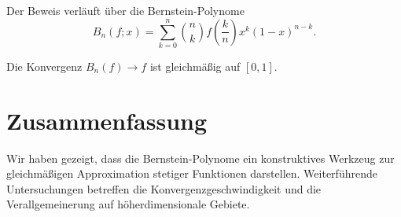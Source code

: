 \documentclass{article}
\begin{document}
Der Beweis verl\"auft \"uber die Bernstein-Polynome
\[
  B_n(f; x) = \sum_{k=0}^{n} \binom{n}{k} f\!\left(\frac{k}{n}\right)
  x^k (1-x)^{n-k}.
\]

Die Konvergenz $B_n(f) \to f$ ist gleichm\"a\ss{}ig auf $[0,1]$.

\section{Zusammenfassung}

Wir haben gezeigt, dass die Bernstein-Polynome ein konstruktives Werkzeug
zur gleichm\"a\ss{}igen Approximation stetiger Funktionen darstellen.
Weiterf\"uhrende Untersuchungen betreffen die Konvergenzgeschwindigkeit
und die Verallgemeinerung auf h\"oherdimensionale Gebiete.
\end{document}
